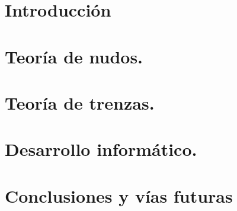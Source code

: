 \documentclass[a4paper,12pt]{book}
\begin{document}
\newtheorem{teo}{Teorema}[section]
\newtheorem{pro}{Proposición}[section]
\newtheorem{lem}{Lema}[section]
\newtheorem{cor}{Corolario}[section]
\newtheorem{alg}{Algoritmo}[section]


\frontmatter
{}


\tableofcontents
\listoffigures

\mainmatter
\chapter{Introducción}
\label{ch0}


\chapter{Teoría de nudos.}
\label{ch1}








\chapter{Teoría de trenzas.}
\label{ch2}






\chapter{Desarrollo informático.}
\label{ch3}





\chapter{Conclusiones y vías futuras}
\label{ch4}




\end{document}
